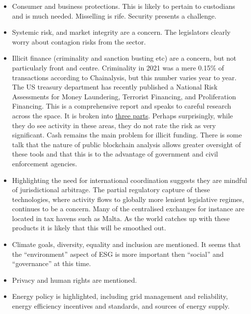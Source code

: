 \begin{itemize}
\item Consumer and business protections. This is likely to pertain to custodians and is much needed. Misselling is rife. Security presents a challenge.  
\item Systemic risk, and market integrity are a concern. The legislators clearly worry about contagion risks from the sector.
\item Illicit finance (criminality and sanction busting etc) are a concern, but not particularly front and centre\cite{moser2013inquiry}. Criminality in 2021 was a mere 0.15\% of transactions according to Chainalysis, but this number varies year to year. The US treasury department has recently published a National Risk Assessments for Money Laundering, Terrorist Financing, and Proliferation Financing. This is a comprehensive report and speaks to careful research across the space. It is broken into \href{https://home.treasury.gov/news/press-releases/jy0619}{three parts}. Perhaps surprisingly, while they do see activity in these areas, they do not rate the risk as very significant. Cash remains the main problem for illicit funding. There is some talk that the nature of public blockchain analysis allows greater oversight of these tools and that this is to the advantage of government and civil enforcement agencies.
\item Highlighting the need for international coordination suggests they are mindful of jurisdictional arbitrage. 
The partial regulatory capture of these technologies, where activity flows to globally more lenient legislative regimes, continues to be a concern. Many of the centralised exchanges for instance are located in tax havens such as Malta. As the world catches up with these products it is likely that this will be smoothed out.
\item Climate goals, diversity, equality and inclusion are mentioned. It seems that the ``environment'' aspect of ESG is more important then ``social'' and ``governance'' at this time.
\item Privacy and human rights are mentioned.
\item Energy policy is highlighted, including grid management and reliability, energy efficiency incentives and standards, and sources of energy supply.
\end{itemize}

